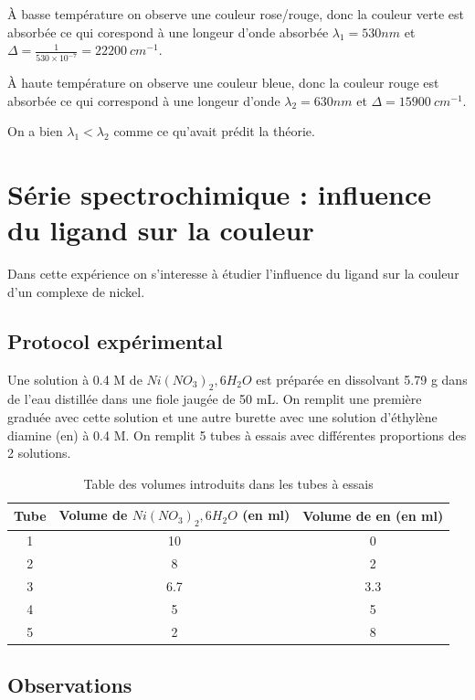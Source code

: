\documentclass[12pt]{article}
\begin{document}
À basse température on observe une couleur rose/rouge, donc la couleur verte est absorbée ce qui corespond à une longeur d'onde absorbée $\lambda_1=530 nm$ et $\Delta=\frac{1}{530 \times 10^{-7}}=22200 \ cm^{-1}$.

À haute température on observe une couleur bleue, donc la couleur rouge est absorbée ce qui correspond à une longeur d'onde $\lambda_2=630 nm$ et $\Delta=15 900 \ cm^{-1}$.

On a bien $\lambda_1<\lambda_2$ comme ce qu'avait prédit la théorie.

\section{Série spectrochimique : influence du ligand sur la couleur}

Dans cette expérience on s'interesse à étudier l'influence du ligand sur la couleur d'un complexe de nickel.

\subsection{Protocol expérimental}

Une solution à 0.4 M de $Ni(NO_3)_2,6H_2O$ est préparée en dissolvant 5.79 g dans de l'eau distillée dans une fiole jaugée de 50 mL.
On remplit une première graduée avec cette solution et une autre burette avec une solution d'éthylène diamine (en) à 0.4 M.
On remplit 5 tubes à essais avec différentes proportions des 2 solutions.

\begin{table}[h!]
    \begin{center}
        \begin{tabular}{|c|c|c|}
            \hline
            Tube & Volume de $Ni(NO_3)_2,6H_2O$ (en ml) & Volume de en (en ml) \\
            \hline
            1 & 10 & 0 \\
            2 & 8 & 2 \\
            3 & 6.7 & 3.3 \\
            4 & 5 & 5 \\
            5 & 2 & 8 \\
            \hline
        \end{tabular}
        \caption{Table des volumes introduits dans les tubes à essais}
        \label{table1:volume}
    \end{center}
\end{table}

\subsection{Observations}
\end{document}
